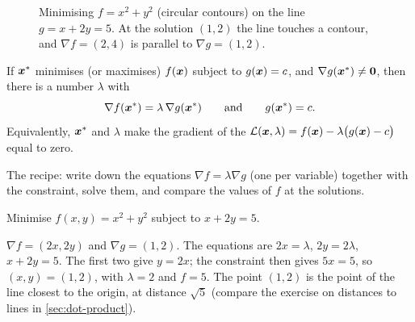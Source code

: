 \begin{figure}[htbp]
\centering
{}
\caption{Minimising $f = x^2 + y^2$ (circular contours) on the line
  $g = x + 2y = 5$. At the solution $(1, 2)$ the line touches a contour, and
  $\nabla f = (2, 4)$ is parallel to $\nabla g = (1, 2)$.}
\label{fig:lagrange}
\end{figure}

\begin{theorem}\label{thm:lagrange}
If $\bm{x}^*$ minimises (or maximises) $f(\bm{x})$ subject to $g(\bm{x}) = c$, and
$\nabla g(\bm{x}^*) \neq \bm{0}$, then there is a number $\lambda$ with
\[
  \nabla f(\bm{x}^*) = \lambda\,\nabla g(\bm{x}^*) \qquad\text{and}\qquad g(\bm{x}^*) = c .
\]
Equivalently, $\bm{x}^*$ and $\lambda$ make the gradient of the 
$\mathcal{L}(\bm{x}, \lambda) = f(\bm{x}) - \lambda\bigl(g(\bm{x}) - c\bigr)$ equal to zero.
\end{theorem}

The recipe: write down the equations $\nabla f = \lambda\nabla g$ (one per
variable) together with the constraint, solve them, and compare the values of
$f$ at the solutions.

\begin{example}\label{ex:lagrange-line}
Minimise $f(x, y) = x^2 + y^2$ subject to $x + 2y = 5$.

\sol $\nabla f = (2x, 2y)$ and $\nabla g = (1, 2)$. The equations are
$2x = \lambda$, $2y = 2\lambda$, $x + 2y = 5$. The first two give $y = 2x$; the
constraint then gives $5x = 5$, so $(x, y) = (1, 2)$, with $\lambda = 2$ and
$f = 5$. The point $(1, 2)$ is the point of the line closest to the origin, at
distance $\sqrt5$ (compare the exercise on distances to lines in
\cref{sec:dot-product}).
\end{example}

